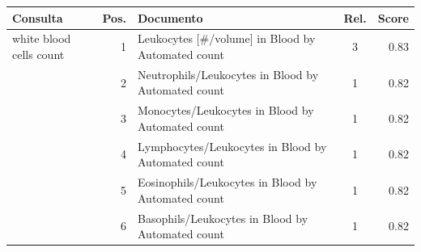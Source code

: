 \begin{tabular}{lrp{7cm}cr}
\toprule
Consulta & Pos. & Documento & Rel. & Score \\
\midrule
white blood cells count & 1 & Leukocytes [\#/volume] in Blood by Automated count & 3 & 0.83 \\
 & 2 & Neutrophils/Leukocytes in Blood by Automated count & 1 & 0.82 \\
 & 3 & Monocytes/Leukocytes in Blood by Automated count & 1 & 0.82 \\
 & 4 & Lymphocytes/Leukocytes in Blood by Automated count & 1 & 0.82 \\
 & 5 & Eosinophils/Leukocytes in Blood by Automated count & 1 & 0.82 \\
 & 6 & Basophils/Leukocytes in Blood by Automated count & 1 & 0.82 \\
\bottomrule
\end{tabular}
